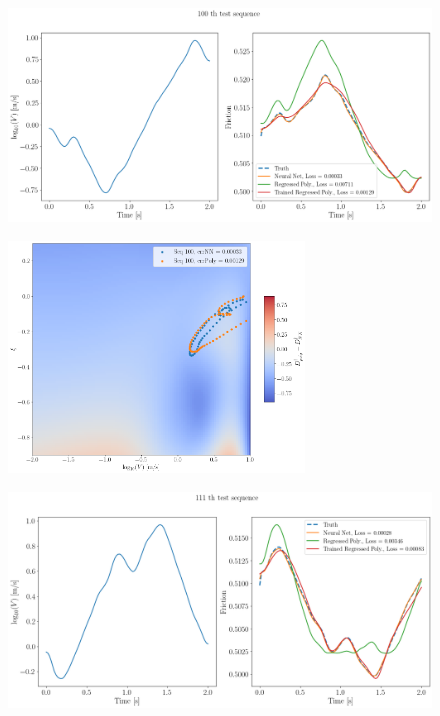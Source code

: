 \begin{figure}[H]
    \centering
    \includegraphics[width=1.0\textwidth]{images/polynomialRegressedTrainedSeq100.png}
\end{figure}
\begin{figure}[H]
    \centering
    \includegraphics[width=0.7\textwidth]{images/Trial0216_errDdagger_seq100.png}
\end{figure}
\begin{figure}[H]
    \centering
    \includegraphics[width=1.0\textwidth]{images/polynomialRegressedTrainedSeq111.png}
\end{figure}
